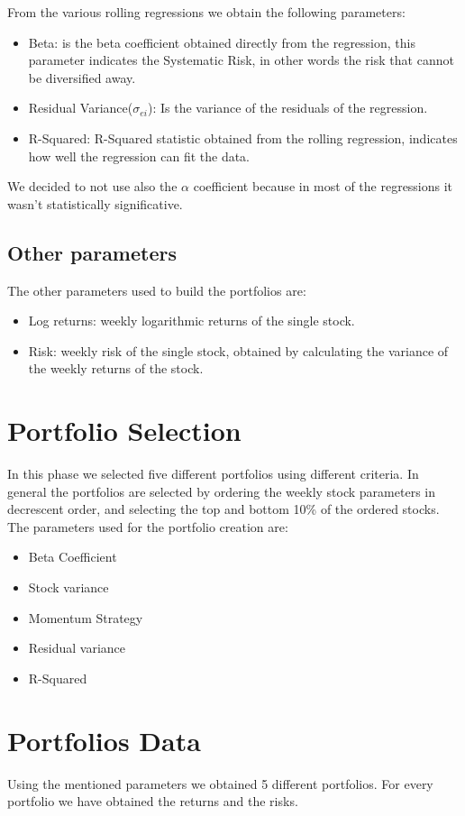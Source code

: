 \documentclass[12pt, a4paper, twocolumn]{article} %
\begin{document}
	From the various rolling regressions we obtain the following parameters:
	\begin{itemize}
		\item Beta: is the beta coefficient obtained directly from the regression, this parameter indicates the Systematic Risk, in other words the risk that cannot be diversified away.
		\item Residual Variance($\sigma_{ei}$): Is the variance of the residuals of the regression.
		\item R-Squared: R-Squared statistic obtained from the rolling regression, indicates how well the regression can fit the data.
	\end{itemize}
	We decided to not use also the $\alpha$ coefficient because in most of the regressions it wasn't statistically significative.
	\subsection{Other parameters}
	The other parameters used to build the portfolios are:
	\begin{itemize}
		\item Log returns: weekly logarithmic returns of the single stock.
		\item Risk: weekly risk of the single stock, obtained by calculating the variance of the weekly returns of the stock.
	\end{itemize}
	
	\section{Portfolio Selection}
	In this phase we selected five different portfolios using different criteria. In general the portfolios are selected by ordering the weekly stock parameters in decrescent order, and selecting the top and bottom 10\% of the ordered stocks.
	The parameters used for the portfolio creation are:
	\begin{itemize}
		\item Beta Coefficient
		\item Stock variance
		\item Momentum Strategy
		\item Residual variance
		\item R-Squared
	\end{itemize}
	\section{Portfolios Data}
	Using the mentioned parameters we obtained 5 different portfolios. For every portfolio we have obtained the returns and the risks.
\end{document}
